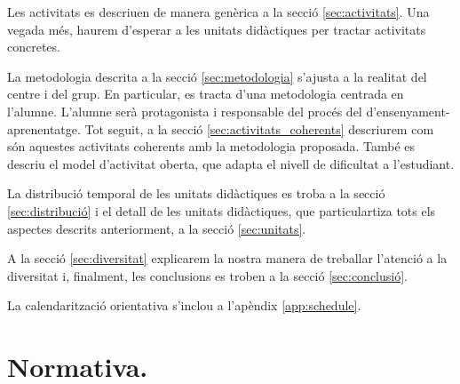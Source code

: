 \documentclass[catalan, a4paper, 12pt, titlepage]{article}
\begin{document}
Les activitats es descriuen de manera genèrica a la secció \ref{sec:activitats}.
Una vegada més, haurem d'esperar a les unitats didàctiques per tractar activitats concretes.

La metodologia descrita a la secció \ref{sec:metodologia} s'ajusta a la realitat del centre i del grup.
En particular, es tracta d'una metodologia centrada en l'alumne.
L'alumne serà protagonista i responsable del procés del d'ensenyament-aprenentatge.
Tot seguit, a la secció \ref{sec:activitats_coherents} descriurem com són aquestes activitats coherents amb la metodologia proposada.
També es descriu el model d'activitat oberta, que adapta el nivell de dificultat a l'estudiant.

La distribució temporal de les unitats didàctiques es troba a la secció \ref{sec:distribució} i el detall de les unitats didàctiques, que particulartiza tots els aspectes descrits anteriorment, a la secció \ref{sec:unitats}.

A la secció \ref{sec:diversitat} explicarem la nostra manera de treballar l'atenció a la diversitat i, finalment, les conclusions es troben a la secció \ref{sec:conclusió}.

La calendarització orientativa s'inclou a l'apèndix \ref{app:schedule}.

\section{Normativa.}
\label{sec:normativa}
\end{document}
